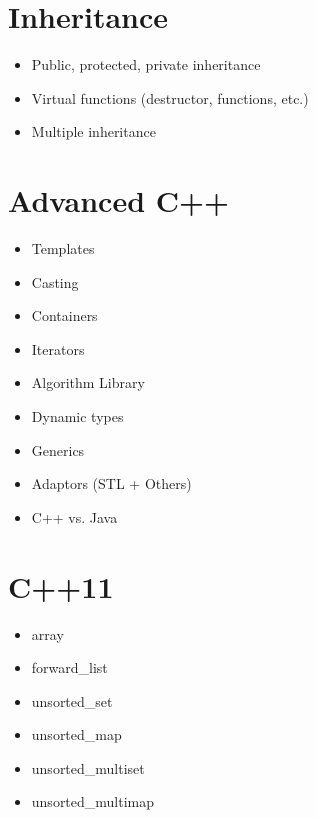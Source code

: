 \documentclass{article}
\begin{document}
\begin{multicols}{2}
\section{Inheritance}

\begin{itemize}
	\item{Public, protected, private inheritance}
	\item{Virtual functions (destructor, functions, etc.)}
	\item{Multiple inheritance}
\end{itemize}

\section{Advanced C++}

\begin{itemize}
	\item{Templates}
	\item{Casting}
	\item{Containers}
	\item{Iterators}
	\item{Algorithm Library}
	\item{Dynamic types}
	\item{Generics}
	\item{Adaptors (STL + Others)}
	\item{C++ vs. Java}
\end{itemize}

\section{C++11}

\begin{itemize}
	\item{array}
	\item{forward\_list}
	\item{unsorted\_set}
	\item{unsorted\_map}
	\item{unsorted\_multiset}
	\item{unsorted\_multimap}
\end{itemize}
	
\end{multicols}
\end{document}

